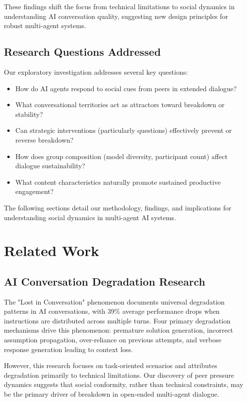 \documentclass[11pt,letterpaper]{article}
\begin{document}
These findings shift the focus from technical limitations to social dynamics in understanding AI conversation quality, suggesting new design principles for robust multi-agent systems.

\subsection{Research Questions Addressed}

Our exploratory investigation addresses several key questions:

\begin{itemize}
    \item How do AI agents respond to social cues from peers in extended dialogue?
    \item What conversational territories act as attractors toward breakdown or stability?
    \item Can strategic interventions (particularly questions) effectively prevent or reverse breakdown?
    \item How does group composition (model diversity, participant count) affect dialogue sustainability?
    \item What content characteristics naturally promote sustained productive engagement?
\end{itemize}

The following sections detail our methodology, findings, and implications for understanding social dynamics in multi-agent AI systems.

\section{Related Work}

\subsection{AI Conversation Degradation Research}

The "Lost in Conversation" phenomenon \citep{laban2025lost} documents universal degradation patterns in AI conversations, with 39\% average performance drops when instructions are distributed across multiple turns. Four primary degradation mechanisms drive this phenomenon: premature solution generation, incorrect assumption propagation, over-reliance on previous attempts, and verbose response generation leading to context loss.

However, this research focuses on task-oriented scenarios and attributes degradation primarily to technical limitations. Our discovery of peer pressure dynamics suggests that social conformity, rather than technical constraints, may be the primary driver of breakdown in open-ended multi-agent dialogue.
\end{document}
